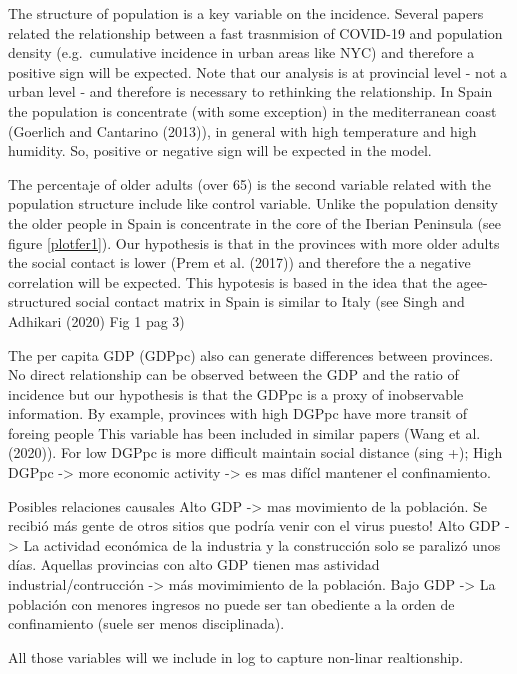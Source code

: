 \documentclass[]{elsarticle} %
\begin{document}
The structure of population is a key variable on the incidence. Several
papers related the relationship between a fast trasnmision of COVID-19
and population density (e.g.~cumulative incidence in urban areas like
NYC) and therefore a positive sign will be expected. Note that our
analysis is at provincial level - not a urban level - and therefore is
necessary to rethinking the relationship. In Spain the population is
concentrate (with some exception) in the mediterranean coast (Goerlich
and Cantarino (2013)), in general with high temperature and high
humidity. So, positive or negative sign will be expected in the model.

The percentaje of older adults (over 65) is the second variable related
with the population structure include like control variable. Unlike the
population density the older people in Spain is concentrate in the core
of the Iberian Peninsula (see figure \ref{plotfer1}). Our hypothesis is
that in the provinces with more older adults the social contact is lower
(Prem et al. (2017)) and therefore the a negative correlation will be
expected. This hypotesis is based in the idea that the agee-structured
social contact matrix in Spain is similar to Italy (see Singh and
Adhikari (2020) Fig 1 pag 3)

The per capita GDP (GDPpc) also can generate differences between
provinces. No direct relationship can be observed between the GDP and
the ratio of incidence but our hypothesis is that the GDPpc is a proxy
of inobservable information. By example, provinces with high DGPpc have
more transit of foreing people This variable has been included in
similar papers (Wang et al. (2020)). For low DGPpc is more difficult
maintain social distance (sing +); High DGPpc -\textgreater{} more
economic activity -\textgreater{} es mas difícl mantener el
confinamiento.

Posibles relaciones causales Alto GDP -\textgreater{} mas movimiento de
la población. Se recibió más gente de otros sitios que podría venir con
el virus puesto! Alto GDP -\textgreater{} La actividad económica de la
industria y la construcción solo se paralizó unos días. Aquellas
provincias con alto GDP tienen mas astividad industrial/contrucción
-\textgreater{} más movimimiento de la población. Bajo GDP
-\textgreater{} La población con menores ingresos no puede ser tan
obediente a la orden de confinamiento (suele ser menos disciplinada).

All those variables will we include in log to capture non-linar
realtionship.
\end{document}
